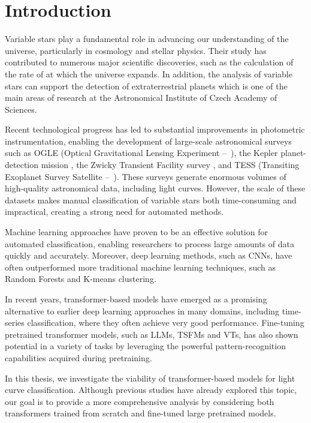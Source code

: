 \chapter{Introduction}
\setcounter{page}{1}

Variable stars play a fundamental role in advancing our understanding of the universe, particularly in cosmology and stellar physics.
Their study has contributed to numerous major scientific discoveries, such as the calculation of the rate of at which the universe expands. \parencite{Hubble1929}
In addition, the analysis of variable stars can support the detection of extraterrestrial planets which is one of the main areas of research at the Astronomical Institute of Czech Academy of Sciences.

Recent technological progress has led to substantial improvements in photometric instrumentation, enabling the development of large-scale astronomical surveys such as OGLE (Optical Gravitational Lensing Experiment --~\cite{Udalski2008}), the Kepler planet-detection mission \parencite{Borucki2010}, the Zwicky Transient Facility survey \parencite{Bellm2019}, and TESS (Transiting Exoplanet Survey Satellite --~\cite{Ricker2014}).
These surveys generate enormous volumes of high-quality astronomical data, including light curves.
However, the scale of these datasets makes manual classification of variable stars both time-consuming and impractical, creating a strong need for automated methods.

Machine learning approaches have proven to be an effective solution for automated classification, enabling researchers to process large amounts of data quickly and accurately.
Moreover, deep learning methods, such as CNNs, have often outperformed more traditional machine learning techniques, such as Random Forests and K-means clustering.

In recent years, transformer-based models have emerged as a promising alternative to earlier deep learning approaches in many domains, including time-series classification, where they often achieve very good performance.
Fine-tuning pretrained transformer models, such as LLMs, TSFMs and VTs, has also shown potential in a variety of tasks by leveraging the powerful pattern-recognition capabilities acquired during pretraining.

In this thesis, we investigate the viability of transformer-based models for light curve classification.
Although previous studies have already explored this topic, our goal is to provide a more comprehensive analysis by considering both transformers trained from scratch and fine-tuned large pretrained models.



